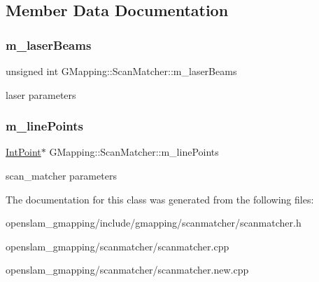 \subsection{Member Data Documentation}
\mbox{\label{classGMapping_1_1ScanMatcher_ade447080711cbb616eb19cdd55d6a266}} 
\subsubsection{\texorpdfstring{m\+\_\+laser\+Beams}{m\_laserBeams}}
{\footnotesize\ttfamily unsigned int G\+Mapping\+::\+Scan\+Matcher\+::m\+\_\+laser\+Beams\hspace{0.3cm}{\ttfamily [protected]}}

laser parameters \mbox{\label{classGMapping_1_1ScanMatcher_a73a0f19d405bb52d342e73e6152bf76a}} 
\subsubsection{\texorpdfstring{m\+\_\+line\+Points}{m\_linePoints}}
{\footnotesize\ttfamily \hyperlink{structGMapping_1_1point}{Int\+Point}$\ast$ G\+Mapping\+::\+Scan\+Matcher\+::m\+\_\+line\+Points\hspace{0.3cm}{\ttfamily [protected]}}

scan\+\_\+matcher parameters 

The documentation for this class was generated from the following files\+:\begin{DoxyCompactItemize}
\item 
openslam\+\_\+gmapping/include/gmapping/scanmatcher/scanmatcher.\+h\item 
openslam\+\_\+gmapping/scanmatcher/scanmatcher.\+cpp\item 
openslam\+\_\+gmapping/scanmatcher/scanmatcher.\+new.\+cpp\end{DoxyCompactItemize}
